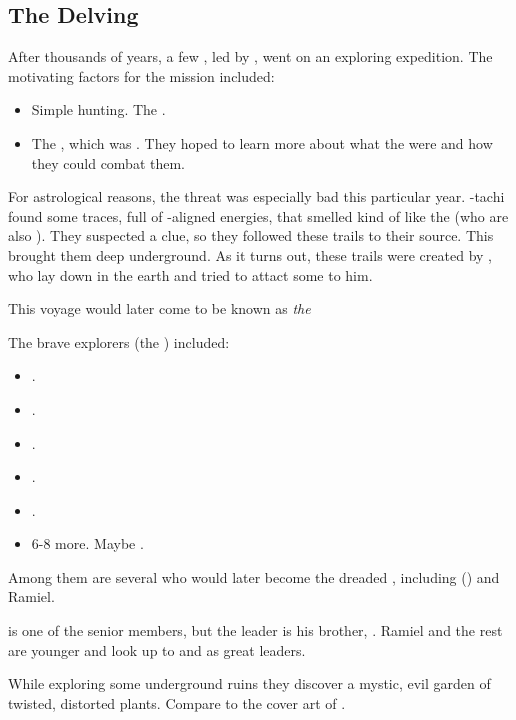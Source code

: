 \subsection{The Delving}
\index{\Delving}
After thousands of years, a few \resphain, led by \Damiarch, went on an exploring expedition. 
The motivating factors for the mission included: 

\begin{itemize}
  \item 
    Simple hunting. 
    The \resphain{} . 
  \item 
    The , which was . 
    They hoped to learn more about what the \umbrae{} were and how they could combat them. 
\end{itemize}

For astrological reasons, the \umbra{} threat was especially bad this particular year. 
\Damiarch-tachi found some traces, full of \Erebos-aligned energies, that smelled kind of like the \umbrae{} (who are also \Erebean). 
They suspected a clue, so they followed these trails to their source.
This brought them deep underground. 
As it turns out, these trails were created by \Semiza, who lay down in the earth and tried to attact some \resphain{} to him. 

This voyage would later come to be known as \emph{the \Delving}

The brave explorers (the \quo{\Delvers}) included: 

\begin{itemize}
  \item \Damiarch.
  \item \Gevural.
  \item \Zachirah.
  \item \Ramiel.
  \item \Shiaraid.
  \item 6-8 more. Maybe \Sithiyacaan.
\end{itemize}

Among them are several who would later become the dreaded \satharioth, including \Gevural{} (\Azraid{}) and Ramiel. 

\Gevural{} is one of the senior members, but the leader is his brother, \Damiarch. Ramiel and the rest are younger and look up to \Damiarch{} and \Gevural{} as great leaders. 

While exploring some underground ruins they discover a mystic, evil garden of twisted, distorted plants. 
Compare to the cover art of . 

